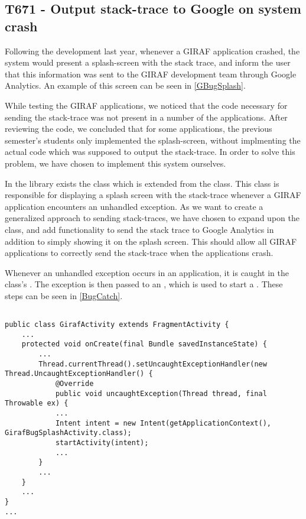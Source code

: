 \subsection{T671 - Output stack-trace to Google on system crash}
Following the development last year, whenever a GIRAF application crashed, the
system would present a splash-screen with the stack trace, and inform the user
that this information was sent to the GIRAF development team through Google
Analytics. An example of this screen can be seen in \autoref{GBugSplash}.


While testing the GIRAF applications, we noticed that the code necessary for
sending the stack-trace was not present in a number of the applications. After
reviewing the code, we concluded that for some applications, the previous
semester's students only implemented the splash-screen, without implmenting the
actual code which was supposed to output the stack-trace. In order to solve this
problem, we have chosen to implement this system ourselves.\nl

In the library  exists the class
 which is extended from the 
class. This class is responsible for displaying a splash screen with the
stack-trace whenever a GIRAF application encounters an unhandled exception. As
we want to create a generalized approach to sending stack-traces, we have chosen
to expand upon the  class, and add functionality
to send the stack trace to Google Analytics in addition to simply showing it on
the splash screen. This should allow all GIRAF applications to correctly send
the stack-trace when the applications crash. \nl

Whenever an unhandled exception occurs in an application, it is caught in the
 class's . The exception is
then passed to an , which is used to start a
. These steps can be seen in
\autoref{BugCatch}.\nl


\begin{minipage}[H]{\linewidth}
\begin{lstlisting}[caption = Catching exceptions and starting creating a \textc{GirafBugSplashActivity}, label = BugCatch]

public class GirafActivity extends FragmentActivity {
	...
    protected void onCreate(final Bundle savedInstanceState) {
    	...
    	Thread.currentThread().setUncaughtExceptionHandler(new Thread.UncaughtExceptionHandler() {
            @Override
            public void uncaughtException(Thread thread, final Throwable ex) {
            ...
            Intent intent = new Intent(getApplicationContext(), GirafBugSplashActivity.class);
			startActivity(intent);
			...
		}
		...
	}
	...
}
...			
\end{lstlisting}
\end{minipage}

